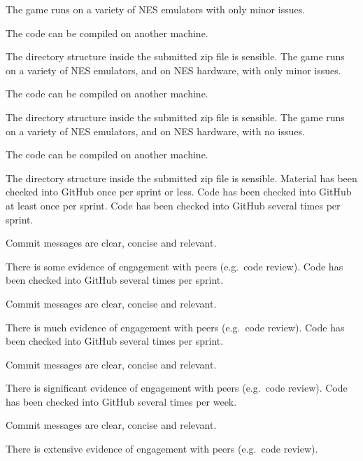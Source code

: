 \documentclass{../../fal_assignment}
\begin{document}
\begin{markingrubric}
        \grade The game runs on a variety of NES emulators with only minor issues.
        	\par The code can be compiled on another machine.
            \par The directory structure inside the submitted zip file is sensible.
        \grade The game runs on a variety of NES emulators, and on NES hardware, with only minor issues.
        	\par The code can be compiled on another machine.
            \par The directory structure inside the submitted zip file is sensible.
        \grade The game runs on a variety of NES emulators, and on NES hardware, with no issues.
        	\par The code can be compiled on another machine.
            \par The directory structure inside the submitted zip file is sensible.
%
        \grade \fail Material has been checked into GitHub once per sprint or less.
        \grade Code has been checked into GitHub at least once per sprint.
        \grade Code has been checked into GitHub several times per sprint.
            \par Commit messages are clear, concise and relevant.
            \par There is some evidence of engagement with peers (e.g.\ code review).
        \grade Code has been checked into GitHub several times per sprint.
            \par Commit messages are clear, concise and relevant.
            \par There is much evidence of engagement with peers (e.g.\ code review).
        \grade Code has been checked into GitHub several times per sprint.
            \par Commit messages are clear, concise and relevant.
            \par There is significant evidence of engagement with peers (e.g.\ code review).
        \grade Code has been checked into GitHub several times per week.
            \par Commit messages are clear, concise and relevant.
            \par There is extensive evidence of engagement with peers (e.g.\ code review).
\end{markingrubric}
\end{document}
